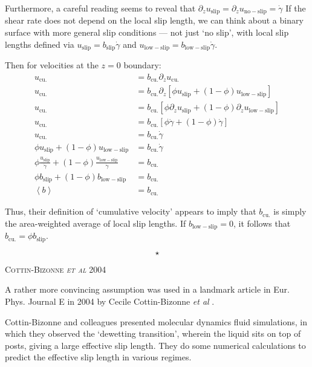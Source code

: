 \documentclass[12pt, a4paper, twoside, openright]{book}
\newcommand{\sep}{\begin{equation*} \star \end{equation*}}
\newcommand{\paper}[1]
         {\colorbox[gray]{0.8}{ \textsc{#1}}
         
         }
\begin{document}
Furthermore, a careful reading seems to reveal that 
$ \partial_z u_{\mathrm{slip}} = \partial_z u_{\mathrm{no-slip}} = \dot{\gamma} $
If the shear rate does not depend on the local slip length, we can think about a binary surface with more general slip conditions --- not just `no slip', with local slip lengths defined via
$u_{\mathrm{slip}} = b_{\mathrm{slip}} \dot{\gamma}$ and $u_{\mathrm{low-slip}} = b_{\mathrm{low-slip}} \dot{\gamma}$.

Then for velocities at the $z=0$ boundary:
\begin{align}
u_{\mathrm{cu.}} & = b_{\mathrm{cu.}} \partial_z u_{\mathrm{cu.}} \\
u_{\mathrm{cu.}} & = b_{\mathrm{cu.}} \partial_z
[ \phi u_{\mathrm{slip}} + (1-\phi) u_{\mathrm{low-slip}} ] \\
u_{\mathrm{cu.}} & = b_{\mathrm{cu.}} 
[ \phi \partial_z u_{\mathrm{slip}} + (1-\phi) \partial_z u_{\mathrm{low-slip}} ] \\
u_{\mathrm{cu.}} & = b_{\mathrm{cu.}} [ \phi \dot{\gamma} + (1-\phi) \dot{\gamma} ]\\
u_{\mathrm{cu.}} & = b_{\mathrm{cu.}} \dot{\gamma}\\
\phi u_{\mathrm{slip}} + (1-\phi) u_{\mathrm{low-slip}} & = b_{\mathrm{cu.}} \dot{\gamma} \\
\phi \frac{u_{\mathrm{slip}}}{\dot{\gamma}} + (1-\phi) \frac{ u_{\mathrm{low-slip}}} {\dot{\gamma}} & = b_{\mathrm{cu.}} \\
\phi b_{\mathrm{slip}} + (1-\phi) b_{\mathrm{low-slip}} & = b_{\mathrm{cu.}} \\
\left< b \right> & = b_{\mathrm{cu.}}
\end{align}

Thus, their definition of `cumulative velocity' appears to imply that $b_{\mathrm{cu.}}$ is simply the area-weighted average of local slip lengths.  If $b_{\mathrm{low-slip}} = 0$, it follows that 
$ b_{\mathrm{cu.}} = \phi b_{\mathrm{slip}} $.

\sep
\clearpage

\paper{Cottin-Bizonne \emph{et al} 2004}
A rather more convincing assumption was used in a landmark article in Eur. Phys. Journal E in 2004 by Cecile Cottin-Bizonne \emph{et al} \cite{Cottin-Bizonne2004}.

Cottin-Bizonne and colleagues presented molecular dynamics fluid simulations, in which they observed the `dewetting transition', wherein the liquid sits on top of posts, giving a large effective slip length.  They do some numerical calculations to predict the effective slip length in various regimes.  
\end{document}

